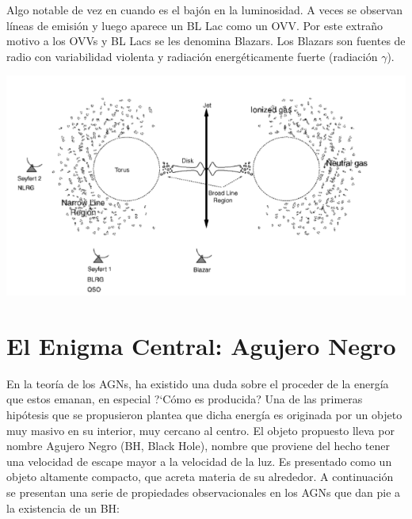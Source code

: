 Algo notable de vez en cuando es el bajón en la luminosidad. A veces se observan líneas de emisión y luego aparece un BL Lac como un OVV. Por este extraño motivo a los OVVs y BL Lacs se les denomina Blazars. Los Blazars son fuentes de radio con variabilidad violenta y radiación energéticamente fuerte (radiación $\gamma$).


\begin{center}
\includegraphics[scale=.5]{./figures/3_AGNs/Clasificacion_AGN}
\label{fig:Tipos_AGNs_por_observador}
\end{center}


\section{El Enigma Central: Agujero Negro}
\label{sec: Enigma_centarl}

En la teoría de los AGNs, ha existido una duda sobre el proceder de la energía que estos emanan, en especial ?`Cómo es producida? Una de las primeras hipótesis que se propusieron plantea que dicha energía es originada por un objeto muy masivo en su interior, muy cercano al centro. El objeto propuesto lleva por nombre  Agujero Negro (BH, Black Hole), nombre que proviene del hecho tener una velocidad de escape mayor a la velocidad de la luz. Es presentado como un objeto altamente compacto, que acreta materia de su alrededor. A continuación se presentan una serie de propiedades observacionales en los AGNs que dan pie a la existencia de un BH: \\

